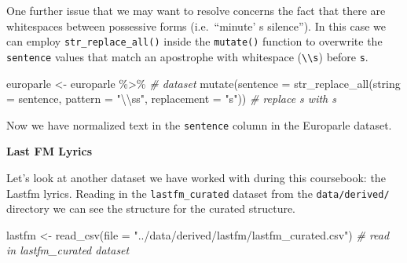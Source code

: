\documentclass[
]{article}
\newenvironment{Shaded}{\begin{snugshade}}{\end{snugshade}}
\newcommand{\AttributeTok}[1]{\textcolor[rgb]{0.77,0.63,0.00}{#1}}
\newcommand{\CommentTok}[1]{\textcolor[rgb]{0.56,0.35,0.01}{\textit{#1}}}
\newcommand{\FunctionTok}[1]{\textcolor[rgb]{0.00,0.00,0.00}{#1}}
\newcommand{\NormalTok}[1]{#1}
\newcommand{\OtherTok}[1]{\textcolor[rgb]{0.56,0.35,0.01}{#1}}
\newcommand{\SpecialCharTok}[1]{\textcolor[rgb]{0.00,0.00,0.00}{#1}}
\newcommand{\StringTok}[1]{\textcolor[rgb]{0.31,0.60,0.02}{#1}}
\begin{document}
One further issue that we may want to resolve concerns the fact that there are whitespaces between possessive forms (i.e.~``minute' s silence''). In this case we can employ \texttt{str\_replace\_all()} inside the \texttt{mutate()} function to overwrite the \texttt{sentence} values that match an apostrophe \texttt{\textquotesingle{}} with whitespace (\texttt{\textbackslash{}\textbackslash{}s}) before \texttt{s}.

\begin{Shaded}
\begin{Highlighting}[]
\NormalTok{europarle }\OtherTok{\textless{}{-}} 
\NormalTok{  europarle }\SpecialCharTok{\%\textgreater{}\%} \CommentTok{\# dataset}
  \FunctionTok{mutate}\NormalTok{(}\AttributeTok{sentence =} \FunctionTok{str\_replace\_all}\NormalTok{(}\AttributeTok{string =}\NormalTok{ sentence, }
                                    \AttributeTok{pattern =} \StringTok{"\textquotesingle{}}\SpecialCharTok{\textbackslash{}\textbackslash{}}\StringTok{ss"}\NormalTok{, }
                                    \AttributeTok{replacement =} \StringTok{"\textquotesingle{}s"}\NormalTok{)) }\CommentTok{\# replace \textquotesingle{} s with \textasciigrave{}s}
\end{Highlighting}
\end{Shaded}

Now we have normalized text in the \texttt{sentence} column in the Europarle dataset.

\textbf{Last FM Lyrics}

Let's look at another dataset we have worked with during this coursebook: the Lastfm lyrics. Reading in the \texttt{lastfm\_curated} dataset from the \texttt{data/derived/} directory we can see the structure for the curated structure.

\begin{Shaded}
\begin{Highlighting}[]
\NormalTok{lastfm }\OtherTok{\textless{}{-}} \FunctionTok{read\_csv}\NormalTok{(}\AttributeTok{file =} \StringTok{"../data/derived/lastfm/lastfm\_curated.csv"}\NormalTok{)  }\CommentTok{\# read in lastfm\_curated dataset}
\end{Highlighting}
\end{Shaded}
\end{document}
